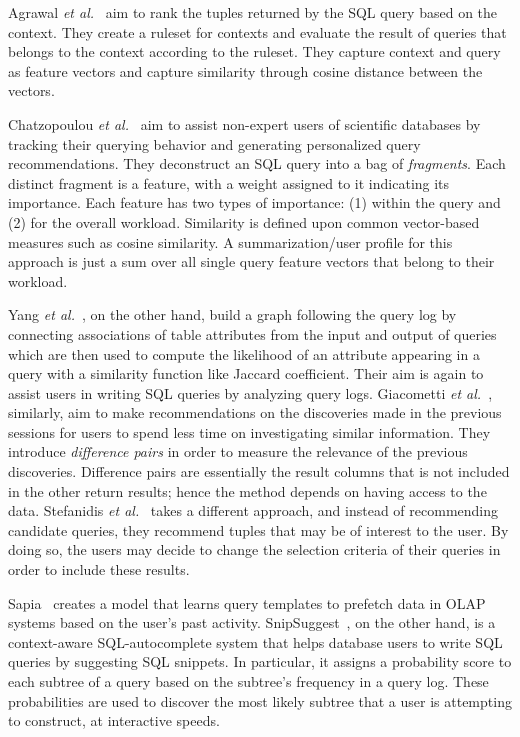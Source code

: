 Agrawal \textit{et al.}~\cite{agrawal2006context} aim to rank the tuples returned by the SQL query based on the context.
They create a ruleset for contexts and evaluate the result of queries that belongs to the context according to the ruleset.
They capture context and query as feature vectors and capture similarity through cosine distance between the vectors.

Chatzopoulou \textit{et al.}~\cite{chatzopoulou2011querie} aim to assist non-expert users of scientific databases by tracking their querying behavior and generating personalized query recommendations.
They deconstruct an SQL query into a bag of \textit{fragments}.
Each distinct fragment is a feature, with a weight assigned to it indicating its importance.
Each feature has two types of importance: (1) within the query and (2) for the overall workload.
Similarity is defined upon common vector-based measures such as cosine similarity.
A summarization/user profile for this approach is just a sum over all single query feature vectors that belong to their workload.

Yang \textit{et al.}~\cite{yang2009}, on the other hand, build a graph following
the query log by connecting associations of table attributes from the input and output of queries which are then used to compute the likelihood of an attribute appearing in a query with a similarity function like Jaccard coefficient.
Their aim is again to assist users in writing SQL queries by analyzing query logs. Giacometti \textit{et al.}~\cite{giacometti2009}, similarly, aim to make recommendations on the discoveries made in the previous sessions for users to spend less time on investigating similar information.
They introduce \textit{difference pairs} in order to measure the relevance of the previous discoveries.
Difference pairs are essentially the result columns that is not included in the other return results; hence the method depends on having access to the data.
Stefanidis \textit{et al.}~\cite{stefanidis2009you} takes a different approach, and instead of recommending candidate queries, they recommend tuples that may be of interest to the user.
By doing so, the users may decide to change the selection criteria of their queries in order to include these results.

Sapia~\cite{Sapia:2000:PPQ:646109.679288} creates a model that learns query templates to prefetch data in OLAP systems based on the user's past activity. SnipSuggest~\cite{magda2010snipsuggest}, on the other hand, is a context-aware SQL-autocomplete system that helps database users to write SQL queries by suggesting SQL snippets.
In particular, it assigns a probability score to each subtree of a query based on the subtree's frequency in a query log.
These probabilities are used to discover the most likely subtree that a user is attempting to construct, at interactive speeds.

